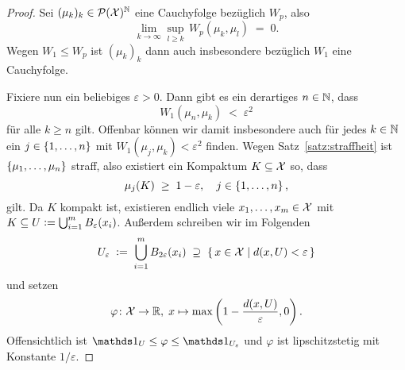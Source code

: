 \documentclass[../thesis/thesis.tex]{subfiles}
\begin{document}
	\begin{proof}
		Sei $(\mu_k)_k \in \mathcal{P}(\mathcal{X})^{\mathbb{N}}$ eine Cauchyfolge bezüglich $W_p$, also
		\[ \lim_{k \to \infty} \sup_{l \geq k} \, W_p(\mu_k, \mu_l) \; = \; 0 \text{.} \]
		Wegen $W_1 \leq W_p$ ist $(\mu_k)_k$ dann auch insbesondere bezüglich $W_1$ eine Cauchyfolge. 
		
		Fixiere nun ein beliebiges $\varepsilon > 0$. Dann gibt es ein derartiges $n \in \mathbb{N}$, dass 
		\[ W_1(\mu_n, \mu_k) \; < \; \varepsilon^2 \]
		für alle $k \geq n$ gilt. Offenbar können wir damit insbesondere auch für jedes $k \in \mathbb{N}$ ein $j \in \left\{1, \dots, n\right\}$ mit
		$W_1(\mu_j, \mu_k) < \varepsilon^2$ finden. Wegen Satz~\ref{satz:straffheit} ist $\left\{\mu_1, \dots, \mu_n\right\}$ straff, also existiert ein Kompaktum
		$K \subseteq \mathcal{X}$ so, dass
		\[ \mu_j(K) \; \geq \; 1 - \varepsilon, \quad j \in \left\{1, \dots, n\right\} \text{,} \]
		gilt. Da $K$ kompakt ist, existieren endlich viele $x_1, \dots, x_m \in \mathcal{X}$ mit 
		$K \subseteq U \vcentcolon = \bigcup_{i=1}^{m} B_{\varepsilon}(x_i)$.
		Außerdem schreiben wir im Folgenden 
		\[ U_{\varepsilon} \; \vcentcolon = \; \bigcup_{i=1}^{m} B_{2\varepsilon}(x_i) \; \supseteq \; \left\{\, x \in \mathcal{X} \; \middle| \; d(x, U) < \varepsilon \,\right\} \] 
		und setzen 
		\[ \varphi \colon \mathcal{X} \to \mathbb{R}, \; x \mapsto \max \left( 1-\frac{d(x, U)}{\varepsilon}, 0 \right)  \text{.} \]
		Offensichtlich ist $\indfct_U \leq \varphi \leq \indfct_{U_\varepsilon}$ und $\varphi$ ist lipschitzstetig mit Konstante $1/\varepsilon$.
		

\end{proof}
\end{document}

